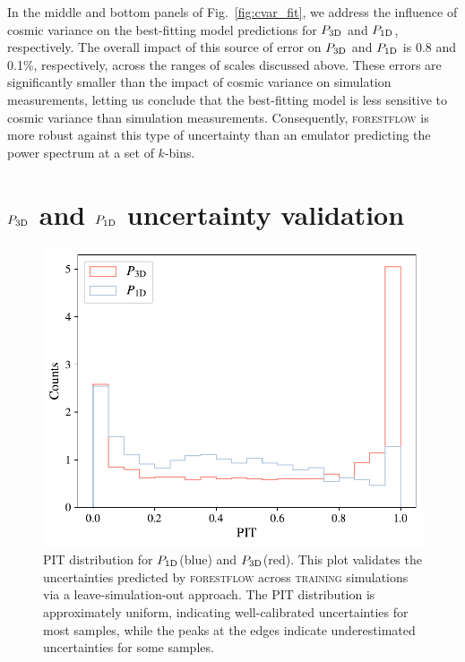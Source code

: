 \documentclass[fleqn,usenatbib]{mnras}
\newcommand{\poned}{\ensuremath{P_{\rm 1D}}\xspace}
\newcommand{\pthreed}{\ensuremath{P_{\rm 3D}}\xspace}
\newcommand{\forestflow}{\textsc{forestflow}\xspace}
\newcommand{\lacehc}{\textsc{training}\xspace}
\begin{document}
In the middle and bottom panels of Fig.~\ref{fig:cvar_fit}, we address the influence of cosmic variance on the best-fitting model predictions for \pthreed and \poned, respectively. The overall impact of this source of error on \pthreed and \poned is 0.8 and 0.1\%, respectively, across the ranges of scales discussed above. These errors are significantly smaller than the impact of cosmic variance on simulation measurements, letting us conclude that the best-fitting model is less sensitive to cosmic variance than simulation measurements. Consequently, \forestflow is more robust against this type of uncertainty than an emulator predicting the power spectrum at a set of $k$-bins.


\section{\pthreed and \poned uncertainty validation}
\label{sec:uncertainty_validation}

\begin{figure}
    \centering\includegraphics[width=\columnwidth]{figures/PIT_P3D.pdf}
    \caption{PIT distribution for \poned (blue) and \pthreed (red). This plot validates the uncertainties predicted by \forestflow across \lacehc simulations via a leave-simulation-out approach. The PIT distribution is approximately uniform, indicating well-calibrated uncertainties for most samples, while the peaks at the edges indicate underestimated uncertainties for some samples.}
    \label{fig:PIT}
\end{figure}
\end{document}

